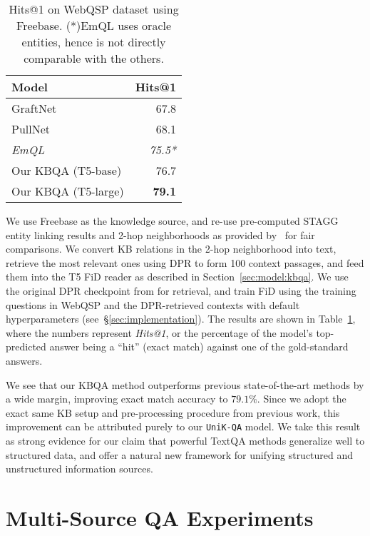 \documentclass[11pt]{article}
\newcommand{\uniqa}{\texttt{UniK-QA}\xspace}
\newcommand{\secref}[1]{\S\ref{#1}}
\begin{document}
\begin{table}[t]
\begin{center}
\begin{tabular}{lr}
\toprule
\textbf{Model} & \textbf{Hits@1} \\ 
\midrule
GraftNet \cite{sun2018open} & 67.8  \\
PullNet \cite{sun2019pullnet} & 68.1  \\ 
\emph{EmQL~\cite{sun2020faithful}} & \emph{75.5*} \\
\midrule
Our KBQA (T5-base) & 76.7  \\
Our KBQA (T5-large) & \textbf{79.1}  \\
\bottomrule
\end{tabular}
\end{center}
\caption{\label{webqsp} Hits@1 on WebQSP dataset using Freebase. (*)EmQL uses oracle entities, hence is not directly comparable with the others.}
\label{tab:webqsp}
\vspace{-3mm}
\end{table} 
We use Freebase as the knowledge source, and re-use pre-computed STAGG entity linking results and 2-hop neighborhoods as provided by~\citet{sun2018open} for fair comparisons.  We convert KB relations in the 2-hop neighborhood into text, retrieve the most relevant ones using DPR to form 100 context passages, and feed them into the T5 FiD reader as described in Section~\ref{sec:model:kbqa}.
We use the original DPR checkpoint from \citet{DPR} for retrieval, and train FiD using the training questions in WebQSP and the DPR-retrieved contexts with default hyperparameters (see~\secref{sec:implementation}).
The results are shown in Table~\ref{tab:webqsp}, where the numbers represent \emph{Hits@1}, or the percentage of the model's top-predicted answer being a ``hit'' (exact match) against one of the gold-standard answers.

We see that our KBQA method outperforms previous state-of-the-art methods by a wide margin, improving exact match accuracy to $79.1\%$.  Since we adopt the exact same KB setup and pre-processing procedure from previous work, this improvement can be attributed purely to our \uniqa{} model.  We take this result as strong evidence for our claim that powerful TextQA methods generalize well to structured data, and offer a natural new framework for unifying structured and unstructured information sources.


 

\section{Multi-Source QA Experiments}\label{sec:experiments}
\end{document}
